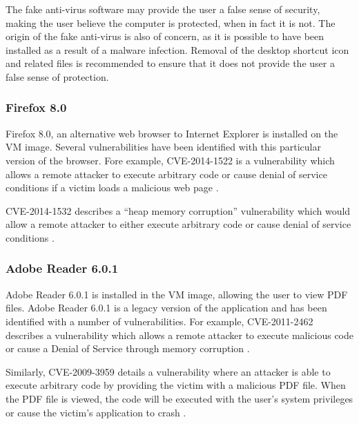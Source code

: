 The fake anti-virus software may provide the user a false sense of security, making the user believe the computer is protected, when in fact it is not. The origin of the fake anti-virus is also of concern, as it is possible to have been installed as a result of a malware infection. Removal of the desktop shortcut icon and related files is recommended to ensure that it does not provide the user a false sense of protection.

\subsubsection{Firefox 8.0}

Firefox 8.0, an alternative web browser to Internet Explorer is installed on the VM image. Several vulnerabilities have been identified with this particular version of the browser. Fore example, CVE-2014-1522 is a vulnerability which allows a remote attacker to execute arbitrary code or cause denial of service conditions if a victim loads a malicious web page \citep{MITRE2014b}.

CVE-2014-1532 describes a ``heap memory corruption'' vulnerability which would allow a remote attacker to either execute arbitrary code or cause denial of service conditions \citep{MITRE2014a}.

\subsubsection{Adobe Reader 6.0.1}

Adobe Reader 6.0.1 is installed in the VM image, allowing the user to view PDF files. Adobe Reader 6.0.1 is a legacy version of the application and has been identified with a number of vulnerabilities. For example, CVE-2011-2462 describes a vulnerability which allows a remote attacker to execute malicious code or cause a Denial of Service through memory corruption \citep{Adobe2011}.

Similarly, CVE-2009-3959 details a vulnerability where an attacker is able to execute arbitrary code by providing the victim with a malicious PDF file. When the PDF file is viewed, the code will be executed with the user's system privileges or cause the victim's application to crash \citep{SecurityFocus2010, SecurityTracker2010}.


